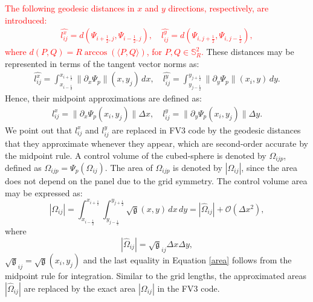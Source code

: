 \documentclass[preprint,12pt]{elsarticle}
\begin{document}
\begin{linenumbers}
\textcolor{red}{
The following geodesic distances in $x$ and $y$ directions, respectively, are introduced:
\begin{align}
	\label{distcube}
	\widehat{l^x_{ij}} = d(\Psi_{i+\frac{1}{2},j},\Psi_{i-\frac{1}{2},j}) , \quad
	\widehat{l^y_{ij}} = d(\Psi_{i,j+\frac{1}{2}},\Psi_{i,j-\frac{1}{2}}),
\end{align}
where $d(P,Q) = R\arccos{(\langle P, Q \rangle)}$, for $P,Q \in \mathbb{S}^2_R$.}
These distances may be represented in terms of the tangent vector norms as:
\begin{align}
	\widehat{l^x_{ij}} = 
	\int_{x_{i-\frac{1}{2}}}^{x_{i+\frac{1}{2}}}
	\|\partial_x  {\Psi}_{p}\|(x,y_j) \,dx ,\quad
	\widehat{l^y_{ij}} =
	\int_{y_{j-\frac{1}{2}}}^{y_{j+\frac{1}{2}}}
	\|\partial_y {\Psi}_{p}\|(x_i,y) \,dy.
\end{align}
Hence, their midpoint approximations are defined as:
\begin{align}
	\label{distcube2}
	{l^x_{ij}} = \|\partial_x {\Psi}_{p}(x_i,y_j)  \|\Delta x,\quad
	{l^y_{ij}} = \|\partial_y {\Psi}_{p}(x_i,y_j) \|\Delta y.
\end{align}
We point out that ${l^x_{ij}}$ and ${l^y_{ij}}$ are replaced in FV3 code by the geodesic distances that they approximate whenever they appear, which are second-order accurate by the midpoint rule.
A control volume of the cubed-sphere is denoted by $\Omega_{ijp}$, defined as $\Omega_{ijp} = {\Psi}_p(\Omega_{ij})$.
The area of $\Omega_{ijp}$ is denoted by $|\Omega_{ij}|$,
since the area does not depend on the panel due to the grid symmetry.
The control volume area may be expressed as:
\begin{equation}
	\label{area}
	|\Omega_{ij}| = \int_{x_{i-\frac{1}{2}}}^{x_{i+\frac{1}{2}}} \int_{y_{j-\frac{1}{2}}}^{y_{j+\frac{1}{2}}}{\sqrt{\mathfrak{g}}(x,y)} \,dx \,dy = 
	|\hat{\Omega}_{ij}| + \mathcal{O}(\Delta x^2),
\end{equation}
where 
\begin{equation}
	\label{area2}
	|\hat{\Omega}_{ij}| = \sqrt{\mathfrak{g}}_{ij} \Delta x \Delta y,
\end{equation} $\sqrt{\mathfrak{g}}_{ij}=\sqrt{\mathfrak{g}}(x_i,y_j) $
and the last equality in Equation \eqref{area} follows from the midpoint rule for integration.
Similar to the grid lengths, the approximated areas $|\hat{\Omega}_{ij}|$ are replaced by the exact area $|\Omega_{ij}|$ in the FV3 code.
\begin{table}[htbp]
	\centering

\end{table}
\end{linenumbers}
\end{document}
